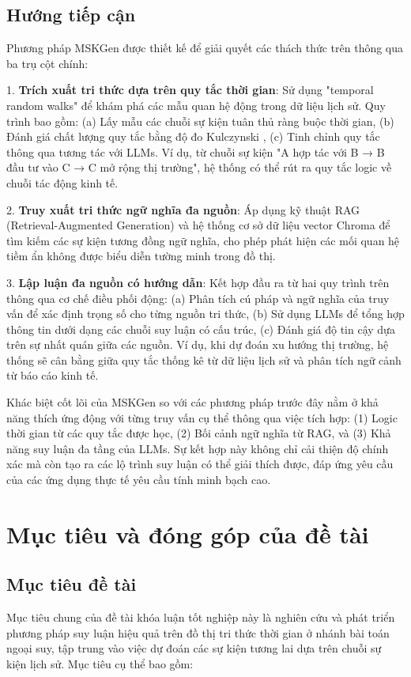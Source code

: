 \subsection{Hướng tiếp cận}
Phương pháp MSKGen được thiết kế để giải quyết các thách thức trên thông qua ba trụ cột chính:

1. \textbf{Trích xuất tri thức dựa trên quy tắc thời gian}: Sử dụng "temporal random walks" \cite{ref_article28} để khám phá các mẫu quan hệ động trong dữ liệu lịch sử. Quy trình bao gồm: (a) Lấy mẫu các chuỗi sự kiện tuân thủ ràng buộc thời gian, (b) Đánh giá chất lượng quy tắc bằng độ đo Kulczynski \cite{ref_article16}, (c) Tinh chỉnh quy tắc thông qua tương tác với LLMs. Ví dụ, từ chuỗi sự kiện "A hợp tác với B → B đầu tư vào C → C mở rộng thị trường", hệ thống có thể rút ra quy tắc logic về chuỗi tác động kinh tế.

2. \textbf{Truy xuất tri thức ngữ nghĩa đa nguồn}: Áp dụng kỹ thuật RAG (Retrieval-Augmented Generation) \cite{ref_article27} và hệ thống cơ sở dữ liệu vector Chroma \cite{ref_article17} để tìm kiếm các sự kiện tương đồng ngữ nghĩa, cho phép phát hiện các mối quan hệ tiềm ẩn không được biểu diễn tường minh trong đồ thị.

3. \textbf{Lập luận đa nguồn có hướng dẫn}: Kết hợp đầu ra từ hai quy trình trên thông qua cơ chế điều phối động: (a) Phân tích cú pháp và ngữ nghĩa của truy vấn để xác định trọng số cho từng nguồn tri thức, (b) Sử dụng LLMs để tổng hợp thông tin dưới dạng các chuỗi suy luận có cấu trúc, (c) Đánh giá độ tin cậy dựa trên sự nhất quán giữa các nguồn. Ví dụ, khi dự đoán xu hướng thị trường, hệ thống sẽ cân bằng giữa quy tắc thống kê từ dữ liệu lịch sử và phân tích ngữ cảnh từ báo cáo kinh tế.

Khác biệt cốt lõi của MSKGen so với các phương pháp trước đây nằm ở khả năng thích ứng động với từng truy vấn cụ thể thông qua việc tích hợp: (1) Logic thời gian từ các quy tắc được học, (2) Bối cảnh ngữ nghĩa từ RAG, và (3) Khả năng suy luận đa tầng của LLMs. Sự kết hợp này không chỉ cải thiện độ chính xác mà còn tạo ra các lộ trình suy luận có thể giải thích được, đáp ứng yêu cầu của các ứng dụng thực tế yêu cầu tính minh bạch cao.

\section{Mục tiêu và đóng góp của đề tài}

\subsection{Mục tiêu đề tài}
Mục tiêu chung của đề tài khóa luận tốt nghiệp này là nghiên cứu và phát triển phương pháp suy luận hiệu quả trên đồ thị tri thức thời gian ở nhánh bài toán ngoại suy, tập trung vào việc dự đoán các sự kiện tương lai dựa trên chuỗi sự kiện lịch sử. Mục tiêu cụ thể bao gồm:

